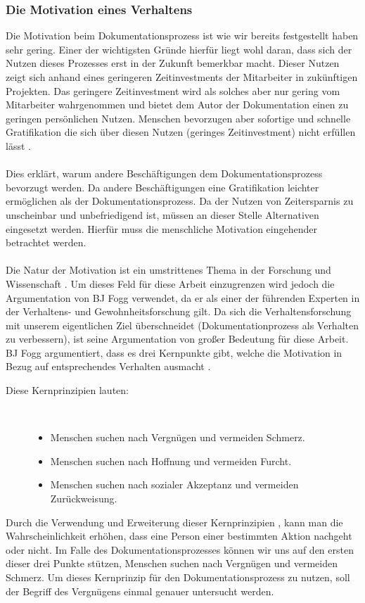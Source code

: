 \documentclass[a4paper,12pt,twoside]{scrartcl}
\begin{document}
\subsubsection{Die Motivation eines Verhaltens}
Die Motivation beim Dokumentationsprozess ist wie wir bereits festgestellt haben sehr gering. Einer der wichtigsten Gründe hierfür liegt wohl daran, dass sich der Nutzen dieses Prozesses erst in der Zukunft bemerkbar macht. Dieser Nutzen zeigt sich anhand eines geringeren Zeitinvestments der Mitarbeiter in zukünftigen Projekten. Das geringere Zeitinvestment wird als solches aber nur gering vom Mitarbeiter wahrgenommen und bietet dem Autor der Dokumentation einen zu geringen persönlichen Nutzen. Menschen bevorzugen aber sofortige und schnelle Gratifikation die sich über diesen Nutzen (geringes Zeitinvestment) nicht erfüllen lässt \cite{Kuhl2009}.
\\\\
Dies erklärt, warum andere Beschäftigungen dem Dokumentationsprozess bevorzugt werden. Da andere Beschäftigungen eine Gratifikation leichter ermöglichen als der Dokumentationsprozess. Da der Nutzen von Zeitersparnis zu unscheinbar und unbefriedigend ist, müssen an dieser Stelle Alternativen eingesetzt werden. Hierfür muss die menschliche Motivation eingehender betrachtet werden.
\\\\
Die Natur der Motivation ist ein umstrittenes Thema in der Forschung und Wissenschaft \cite{Eyal2014}. Um dieses Feld für diese Arbeit einzugrenzen wird jedoch die Argumentation von BJ Fogg verwendet, da er als einer der führenden Experten in der Verhaltens- und Gewohnheitsforschung gilt. Da sich die Verhaltensforschung mit unserem eigentlichen Ziel überschneidet (Dokumentationprozess als Verhalten zu verbessern), ist seine Argumentation von großer Bedeutung für diese Arbeit. BJ Fogg argumentiert, dass es drei Kernpunkte gibt, welche die Motivation in Bezug auf entsprechendes Verhalten ausmacht \cite{Eyal2014}.
\begin{description}
   \item[Diese Kernprinzipien lauten:]~\par
   \begin{itemize}
      \item Menschen suchen nach Vergnügen und vermeiden Schmerz.
      \item Menschen suchen nach Hoffnung und vermeiden Furcht.
      \item Menschen suchen nach sozialer Akzeptanz und vermeiden Zurückweisung.
   \end{itemize}
\end{description}
Durch die Verwendung und Erweiterung dieser Kernprinzipien \cite{Eyal2014}, kann man die Wahrscheinlichkeit erhöhen, dass eine Person einer bestimmten Aktion nachgeht oder nicht. Im Falle des Dokumentationsprozesses können wir uns auf den ersten dieser drei Punkte stützen, Menschen suchen nach Vergnügen und vermeiden Schmerz. Um dieses Kernprinzip für den Dokumentationsprozess zu nutzen, soll der Begriff des Vergnügens einmal genauer untersucht werden.
\end{document}
